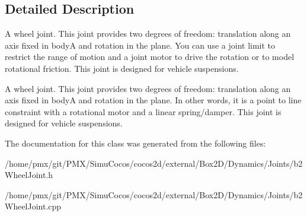 \subsection{Detailed Description}
A wheel joint. This joint provides two degrees of freedom\+: translation along an axis fixed in bodyA and rotation in the plane. You can use a joint limit to restrict the range of motion and a joint motor to drive the rotation or to model rotational friction. This joint is designed for vehicle suspensions.

A wheel joint. This joint provides two degrees of freedom\+: translation along an axis fixed in bodyA and rotation in the plane. In other words, it is a point to line constraint with a rotational motor and a linear spring/damper. This joint is designed for vehicle suspensions. 

The documentation for this class was generated from the following files\+:\begin{DoxyCompactItemize}
\item 
/home/pmx/git/\+P\+M\+X/\+Simu\+Cocos/cocos2d/external/\+Box2\+D/\+Dynamics/\+Joints/b2\+Wheel\+Joint.\+h\item 
/home/pmx/git/\+P\+M\+X/\+Simu\+Cocos/cocos2d/external/\+Box2\+D/\+Dynamics/\+Joints/b2\+Wheel\+Joint.\+cpp\end{DoxyCompactItemize}
